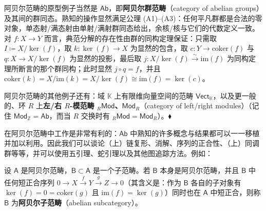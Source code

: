 \begin{Ex}
	阿贝尔范畴的原型例子当然是 $\mathsf{Ab}$，即\textbf{阿贝尔群范畴}（category of abelian groups）及其间的群同态。熟知的操作显然满足公理 (A1)--(A3)：任何平凡群都是合法的零对象，单态射/满态射由单射/满射群同态给出，余核/核与它们的代数定义一致。对 $f:X\rightarrow Y$ 而言，典范分解的存在性由群的同构定理保证：只需取 $I\coloneqq X/\ker(f)$，取 $k:\ker(f)\rightarrow X$ 为显然的包含，取 $c:Y\rightarrow \text{coker}(f)$ 与 $q:X\rightarrow X/\ker(f)$ 为显然的投影，最后取 $j:X/\ker(f)\xrightarrow{\sim}\text{im}(f)$ 为同构定理所断言的那个群同构；此时显然 $j\circ q=f$，并且 $\text{coker}(k)=X/\text{im}(k)=X/\ker(f)\cong \text{im}(f)=\ker(c)$。

	阿贝尔范畴的其他例子还有：域 $\mathbb{K}$ 上有限维向量空间的范畴 $\mathsf{Vect}_\mathbb{K}$，以及更一般的、环 $R$ 上\textbf{左/右 $R$-模范畴 ${}_R\mathsf{Mod}$、$\mathsf{Mod}_R$}（category of left/right modules）（记住 $\mathsf{Mod}_\mathbb{Z}=\mathsf{Ab}$，而当 $R$ 交换时有 ${}_R\mathsf{Mod}=\mathsf{Mod}_R$）。\hfill $\blacklozenge$
\end{Ex}


在阿贝尔范畴中工作是非常有利的：$\mathsf{Ab}$ 中熟知的许多概念与结果都可以一一移植并加以利用。因此我们可以谈论（上）链复形、消解、序列的正合性、（上）同调群等等，并可以使用五引理、蛇引理以及其他图追踪方法。例如：

\begin{Def}\label{abeliansubcat}
	设 $\mathsf{A}$ 是阿贝尔范畴，$\mathsf{B}\subset\mathsf{A}$ 是一个子范畴。若 $\mathsf{B}$ 本身是阿贝尔范畴，并且 $\mathsf{B}$ 中任何短正合序列 $0\rightarrow X\xrightarrow{f} Y\xrightarrow{g} Z\rightarrow 0$（其含义是：作为 $\mathsf{B}$ 各自的子对象有 $\ker(f)=0=\text{coker}(g)$ 且 $\text{im}(f)=\ker(g)$）同时也在 $\mathsf{A}$ 中短正合，则称 $\mathsf{B}$ 为\textbf{阿贝尔子范畴}（abelian subcategory）。
\end{Def} 


